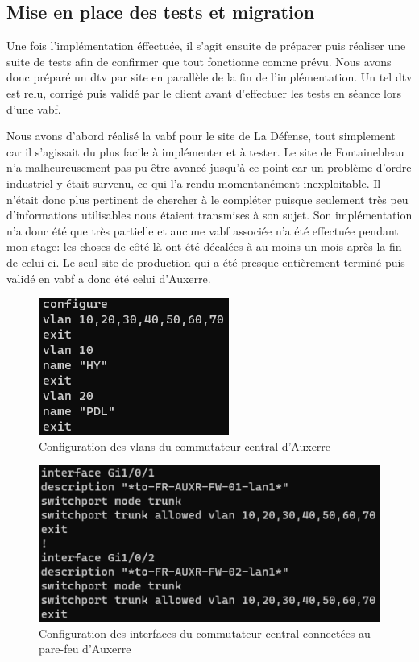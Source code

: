 \documentclass[12pt, oneside, a4paper, titlepage]{report}
\begin{document}
\FloatBarrier{}
\subsection{Mise en place des tests et migration}%
\label{sub:mission::main::tests}

Une fois l'implémentation éffectuée, il s'agit ensuite de préparer puis réaliser
une suite de tests afin de confirmer que tout fonctionne comme prévu. Nous avons
donc préparé un \acrfull{dtv} par site en parallèle de la fin de
l'implémentation. Un tel \gls{dtv} est relu, corrigé puis validé par le client
avant d'effectuer les tests en séance lors d'une \acrfull{vabf}.

Nous avons d'abord réalisé la \gls{vabf} pour le site de La Défense, tout
simplement car il s'agissait du plus facile à implémenter et à tester. Le site
de Fontainebleau n'a malheureusement pas pu être avancé jusqu'à ce point car un
problème d'ordre industriel y était survenu, ce qui l'a rendu momentanément
inexploitable. Il n'était donc plus pertinent de chercher à le compléter puisque
seulement très peu d'informations utilisables nous étaient transmises à son
sujet. Son implémentation n'a donc été que très partielle et aucune \gls{vabf}
associée n'a été effectuée pendant mon stage: les choses de côté-là ont été
décalées à au moins un mois après la fin de celui-ci. Le seul site de production
qui a été presque entièrement terminé puis validé en \gls{vabf} a donc été celui
d'Auxerre.

\begin{figure}[h!]
    \centering
    \includegraphics[width = 0.4\linewidth]{img/sw-auxr/vlans.png}
    \caption{Configuration des \glspl{vlan} du commutateur central d'Auxerre}%
    \label{fig:sw-auxr/vlans}
\end{figure}

\begin{figure}[h!]
    \centering
    \includegraphics[width = 0.7\linewidth]{img/sw-auxr/fw-ifs.png}
    \caption{%
        Configuration des interfaces du commutateur central connectées au
        pare-feu d'Auxerre%
    }%
    \label{fig:sw-auxr/fw-ifs}
\end{figure}
\end{document}
